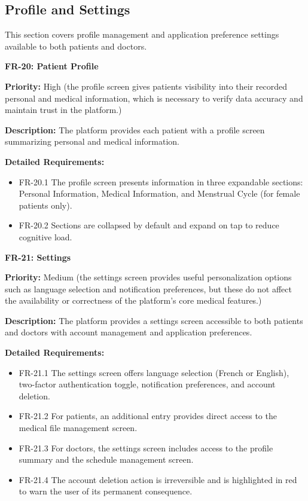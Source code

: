 \subsection{Profile and Settings}

This section covers profile management and application preference settings available
to both patients and doctors.

\textbf{FR-20: Patient Profile}

\textbf{Priority:} High (the profile screen gives patients visibility into their recorded personal and medical information, which is necessary to verify data accuracy and maintain trust in the platform.)

\textbf{Description:} The platform provides each patient with a profile screen
summarizing personal and medical information.

\textbf{Detailed Requirements:}
\begin{itemize}
    \item FR-20.1 \; The profile screen presents information in three expandable
    sections: Personal Information, Medical Information, and Menstrual Cycle
    (for female patients only).
    \item FR-20.2 \; Sections are collapsed by default and expand on tap to reduce
    cognitive load.
\end{itemize}

\medskip

\textbf{FR-21: Settings}

\textbf{Priority:} Medium (the settings screen provides useful personalization options such as language selection and notification preferences, but these do not affect the availability or correctness of the platform's core medical features.)

\textbf{Description:} The platform provides a settings screen accessible to both patients
and doctors with account management and application preferences.

\textbf{Detailed Requirements:}
\begin{itemize}
    \item FR-21.1 \; The settings screen offers language selection (French or English),
    two-factor authentication toggle, notification preferences, and account deletion.
    \item FR-21.2 \; For patients, an additional entry provides direct access to the
    medical file management screen.
    \item FR-21.3 \; For doctors, the settings screen includes access to the profile
    summary and the schedule management screen.
    \item FR-21.4 \; The account deletion action is irreversible and is highlighted
    in red to warn the user of its permanent consequence.
\end{itemize}


